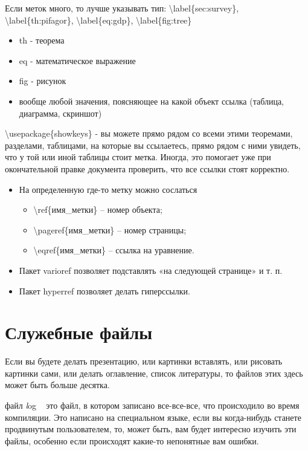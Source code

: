\documentclass[a4paper,12pt]{article} %
\begin{document}
 Если меток много, то лучше указывать тип: \textbackslash label\{sec:survey\},
 \textbackslash label\{th:pifagor\}, \textbackslash label\{eq:gdp\}, \textbackslash label\{fig:tree\}
 \begin{itemize}
 	\item th - теорема
 	\item eq - математическое выражение
 	\item fig - рисунок
 	\item вообще любой значения, поясняющее на какой объект ссылка (таблица, диаграмма, скриншот)
 \end{itemize}
 
 \textbackslash usepackage\{showkeys\}  -  вы можете прямо
 рядом со всеми этими теоремами, разделами,
 таблицами, на которые вы ссылаетесь, прямо рядом с ними
 увидеть, что у той или иной таблицы стоит метка. Иногда, это помогает уже при окончательной
 правке документа проверить, что все ссылки стоят
 корректно.
 
\begin{itemize}
	\item На определенную где-то метку можно сослаться
	\begin{itemize}
		\item \textbackslash ref\{имя\_метки\} -- номер объекта;
		\item \textbackslash pageref\{имя\_метки\} -- номер страницы;
		\item \textbackslash eqref\{имя\_метки\} -- ссылка на уравнение.
	\end{itemize}
	\item Пакет varioref позволяет подставлять «на следующей странице» и т. п.
	\item Пакет hyperref позволяет делать гиперссылки.
\end{itemize}
\section{Служебные файлы}
Если вы будете делать презентацию, или картинки вставлять, или рисовать картинки
сами, или делать оглавление, список литературы,
то файлов этих здесь может быть больше
десятка.

файл \textit log ~ это файл, в котором записано все-все-все, что
происходило во время компиляции. Это написано на специальном языке, если вы когда-нибудь станете продвинутым
пользователем, то, может быть, вам будет интересно изучить эти
файлы, особенно если происходят какие-то
непонятные вам ошибки.
\end{document}
